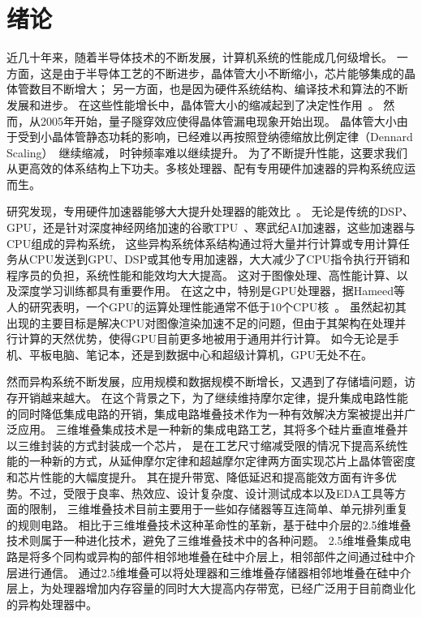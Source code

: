 \chapter{绪论}
\label{chap:intro}
近几十年来，随着半导体技术的不断发展，计算机系统的性能成几何级增长。
一方面，这是由于半导体工艺的不断进步，晶体管大小不断缩小，芯片能够集成的晶体管数目不断增大；
另一方面，也是因为硬件系统结构、编译技术和算法的不断发展和进步。
在这些性能增长中，晶体管大小的缩减起到了决定性作用~\cite{hennessy2011computer}。
然而，从2005年开始，量子隧穿效应使得晶体管漏电现象开始出现。
晶体管大小由于受到小晶体管静态功耗的影响，已经难以再按照登纳德缩放比例定律（Dennard Scaling）~\cite{dennard1974design}继续缩减，
时钟频率难以继续提升。
为了不断提升性能，这要求我们从更高效的体系结构上下功夫。多核处理器、配有专用硬件加速器的异构系统应运而生。

研究发现，专用硬件加速器能够大大提升处理器的能效比~\cite{hameed2010understanding}。 
无论是传统的DSP、GPU，还是针对深度神经网络加速的谷歌TPU~\cite{jouppi2017datacenter}、寒武纪AI加速器，这些加速器与CPU组成的异构系统，
这些异构系统体系结构通过将大量并行计算或专用计算任务从CPU发送到GPU、DSP或其他专用加速器，大大减少了CPU指令执行开销和程序员的负担，系统性能和能效均大大提高。
这对于图像处理、高性能计算、以及深度学习训练都具有重要作用。
在这之中，特别是GPU处理器，据Hameed等人的研究表明，一个GPU的运算处理性能通常不低于10个CPU核~\cite{hameed2010understanding}。
虽然起初其出现的主要目标是解决CPU对图像渲染加速不足的问题，但由于其架构在处理并行计算的天然优势，使得GPU目前更多地被用于通用并行计算。
如今无论是手机、平板电脑、笔记本，还是到数据中心和超级计算机，GPU无处不在。

然而异构系统不断发展，应用规模和数据规模不断增长，又遇到了存储墙问题，访存开销越来越大。
在这个背景之下，为了继续维持摩尔定律，提升集成电路性能的同时降低集成电路的开销，集成电路堆叠技术作为一种有效解决方案被提出并广泛应用。
三维堆叠集成技术是一种新的集成电路工艺，其将多个硅片垂直堆叠并以三维封装的方式封装成一个芯片，
是在工艺尺寸缩减受限的情况下提高系统性能的一种新的方式，从延伸摩尔定律和超越摩尔定律两方面实现芯片上晶体管密度和芯片性能的大幅度提升。
其在提升带宽、降低延迟和提高能效方面有许多优势。不过，受限于良率、热效应、设计复杂度、设计测试成本以及EDA工具等方面的限制，
三维堆叠技术目前主要用于一些如存储器等互连简单、单元排列重复的规则电路。
相比于三维堆叠技术这种革命性的革新，基于硅中介层的2.5维堆叠技术则属于一种进化技术，避免了三维堆叠技术中的各种问题。
2.5维堆叠集成电路是将多个同构或异构的部件相邻地堆叠在硅中介层上，相邻部件之间通过硅中介层进行通信。
通过2.5维堆叠可以将处理器和三维堆叠存储器相邻地堆叠在硅中介层上，为处理器增加内存容量的同时大大提高内存带宽，已经广泛用于目前商业化的异构处理器中。


